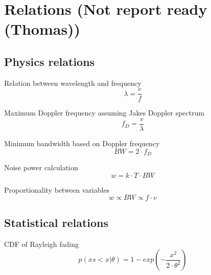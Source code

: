 \section{Relations (Not report ready (Thomas))}

\subsection{Physics relations}
Relation between wavelength and frequency
\begin{equation}
\lambda = \frac{c}{f}
\end{equation}

Maximum Doppler frequency assuming Jakes Doppler spectrum
\begin{equation}
f_D=\frac{v}{\lambda}
\end{equation}

Minimum bandwidth based on Doppler frequency
\begin{equation}
BW = 2\cdot f_D
\end{equation}

Noise power calculation
\begin{equation}
w = k \cdot T \cdot BW
\end{equation}

Proportionality between variables
\begin{equation}
w \propto BW \propto f \cdot v
\end{equation}

\begin{where}
\end{where}



\subsection{Statistical relations}
CDF of Rayleigh fading
\begin{equation}\label{rayleigh_CDF_std}
p(xs < x | \theta) = 1-exp\left(-\frac{x^2}{2\cdot \theta^2}\right)
\end{equation}


